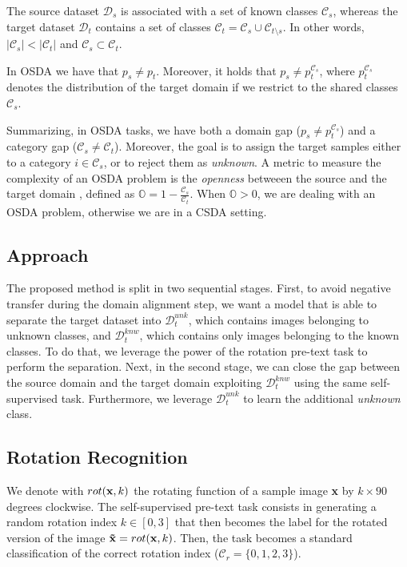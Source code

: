 \documentclass[10pt,twocolumn,letterpaper]{article}
\begin{document}
The source dataset $\mathcal{D}_s$ is associated with a set of known classes $\mathcal{C}_s$,
whereas the target dataset $\mathcal{D}_t$ contains a set of classes $\mathcal{C}_t = \mathcal{C}_s \cup \mathcal{C}_{t \setminus s}$.
In other words,
$|\mathcal{C}_s| < |\mathcal{C}_t|$ and $\mathcal{C}_s \subset \mathcal{C}_t$. 

In OSDA we have that $p_s \neq p_t$.
Moreover, it holds that $p_s \neq p_t^{\mathcal{C}_s}$, where $p_t^{\mathcal{C}_s}$ denotes the distribution of the target domain if we restrict to
the shared classes $\mathcal{C}_s$. 

Summarizing, in OSDA tasks, we have both a domain gap ($p_s \neq p_t^{\mathcal{C}_s}$)
and a category gap ($\mathcal{C}_s \neq \mathcal{C}_t$). Moreover, the goal is to assign the target samples either to a category ${i \in \mathcal{C}_s}$,
or to reject them as {\it unknown}.
A metric to measure the complexity of an OSDA problem is the {\it openness} betweeen the source and the target domain \cite{bendale2015open}, 
defined as $\displaystyle \mathbb{O} = 1-\frac{\mathcal{C}_s}{\mathcal{C}_t}$.
When $\mathbb{O} > 0$, we are dealing with an OSDA problem, otherwise we are in a CSDA setting.

\subsection{Approach}
\label{sec:apporach}
The proposed method is split in two sequential stages. First, to avoid negative transfer during the domain alignment step, we want a model
that is able to separate the target dataset into $\mathcal{D}_t^{unk}$, which contains images belonging to unknown classes,
and $\mathcal{D}_t^{knw}$, which contains only images belonging to the known classes. To do that, we leverage the
power of the rotation pre-text task to perform the separation.
Next, in the second stage, we can close the gap between the source domain and the target domain exploiting $\mathcal{D}_t^{knw}$
using the same self-supervised task. Furthermore, we leverage $\mathcal{D}_t^{unk}$ to learn the additional {\it unknown} class.

\subsection{Rotation Recognition}
\label{sec:rotrecognition}

We denote with $rot({\bf x}, k)$ the rotating function of a sample image {\bf x} by $k\times 90$ degrees clockwise.
The self-supervised pre-text task consists in generating a random rotation index $k \in [0, 3]$ that then becomes
the label for the rotated version of the image ${\bf \tilde{x}} = rot({\bf x}, k)$.
Then, the task becomes a standard classification of the correct rotation index ($\mathcal{C}_r = \{0, 1, 2, 3\}$).
\end{document}
